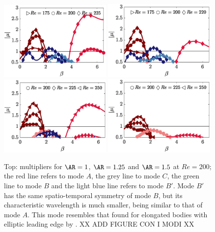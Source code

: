 \begin{figure}
  \centering
  \includegraphics[width=0.49\textwidth]{./fig/AR1/neutralb.eps}
  \includegraphics[width=0.49\textwidth]{./fig/AR1p25/neutralb.eps}  
  \includegraphics[width=0.49\textwidth]{./fig/AR1p5/neutralb.eps}    
  \includegraphics[width=0.49\textwidth]{./fig/AR1p75/neutralb.eps}       
  \caption{Top: multipliers for $\AR=1$, $\AR=1.25$ and $\AR=1.5$ at $Re=200$; the red line refers to mode $A$, the grey line to mode $C$, the green line to mode $B$ and the light blue line refers to mode $B'$. Mode $B'$ has the same spatio-temporal symmetry of mode $B$, but its characteristic wavelength is much smaller, being similar to that of mode $A$. This mode resembles that found for elongated bodies with elliptic leading edge by \cite{ryan-etal-2005}. XX ADD FIGURE CON I MODI XX}
  \label{fig:mult_AR1_AR1p75}
\end{figure}
